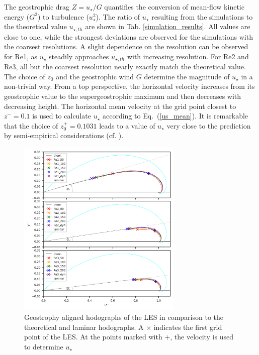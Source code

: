\documentclass[draft,a4paper,11pt]{article}
\begin{document}
The geostrophic drag $Z=u_\star/G$ quantifies the conversion of mean-flow kinetic energy ($G^2$) to turbulence ($u_{\star}^2$). The ratio of $u_{\star}$ resulting from the simulations to the theoretical value $u_{\star,th}$ are shown in Tab. \ref{simulation_results}. All values are close to one, while the strongest deviations are observed for the simulations with the coarsest resolutions. A slight dependence on the resolution can be observed for Re1, as $u_\star$ steadily approaches $u_{\star,th}$ with increasing resolution. For Re2 and Re3, all but the coarsest resolution nearly exactly match the theoretical value. The choice of $z_0$ and the geostrophic wind $G$ determine the magnitude of $u_\star$ in a non-trivial way. From a top perspective, the horizontal velocity increases from its geostrophic value to the supergeostrophic maximum and then decreases with decreasing height. The horizontal mean velocity at the grid point closest to $z^-=0.1$ is used to calculate $u_\star$ according to Eq.~(\ref{us_mean}). It is remarkable that the choice of $z_0^+=0.1031$ leads to a value of $u_{\star}$ very close to the prediction by semi-empirical considerations (cf. \cite{spalart1989theoretical}).

\begin{figure}[ht]
	\centering
	\includegraphics[width=0.7\textwidth]{figures_2024/d3y_3Re_hodograph}
  \caption{Geostrophy aligned hodographs of the LES in comparison to the theoretical and laminar hodographs. A $\times$ indicates the first grid point of the LES. At the points marked with $+$, the velocity is used to determine $u_\star$}
  \label{3Re_hodograph}
\end{figure}
\end{document}
